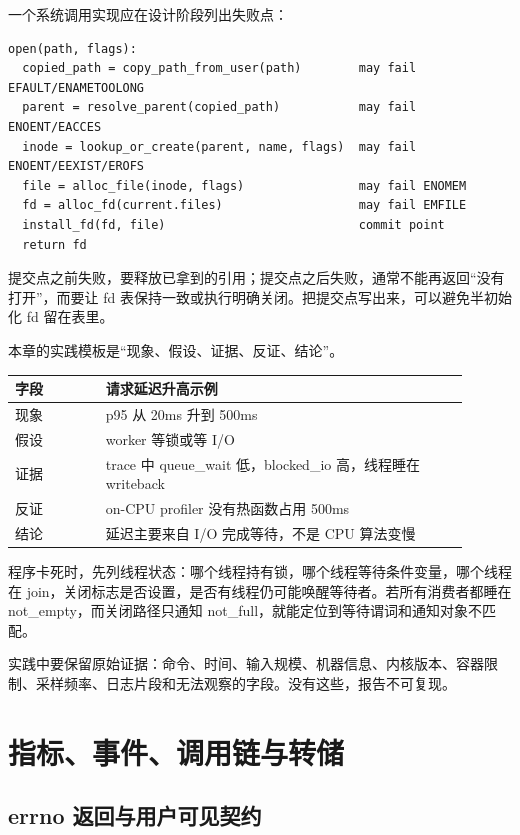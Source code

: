 一个系统调用实现应在设计阶段列出失败点：

\begin{lstlisting}
open(path, flags):
  copied_path = copy_path_from_user(path)        may fail EFAULT/ENAMETOOLONG
  parent = resolve_parent(copied_path)           may fail ENOENT/EACCES
  inode = lookup_or_create(parent, name, flags)  may fail ENOENT/EEXIST/EROFS
  file = alloc_file(inode, flags)                may fail ENOMEM
  fd = alloc_fd(current.files)                   may fail EMFILE
  install_fd(fd, file)                           commit point
  return fd
\end{lstlisting}

提交点之前失败，要释放已拿到的引用；提交点之后失败，通常不能再返回“没有打开”，而要让 fd 表保持一致或执行明确关闭。把提交点写出来，可以避免半初始化 fd 留在表里。

本章的实践模板是“现象、假设、证据、反证、结论”。

\begin{longtable}{|L{0.18\linewidth}|L{0.72\linewidth}|}
\toprule
字段 & 请求延迟升高示例 \\
\midrule
现象 & p95 从 20ms 升到 500ms \\\tablerowrule
假设 & worker 等锁或等 I/O \\\tablerowrule
证据 & trace 中 queue\_wait 低，blocked\_io 高，线程睡在 writeback \\\tablerowrule
反证 & on-CPU profiler 没有热函数占用 500ms \\\tablerowrule
结论 & 延迟主要来自 I/O 完成等待，不是 CPU 算法变慢 \\
\bottomrule
\end{longtable}

程序卡死时，先列线程状态：哪个线程持有锁，哪个线程等待条件变量，哪个线程在 join，关闭标志是否设置，是否有线程仍可能唤醒等待者。若所有消费者都睡在 not\_empty，而关闭路径只通知 not\_full，就能定位到等待谓词和通知对象不匹配。

实践中要保留原始证据：命令、时间、输入规模、机器信息、内核版本、容器限制、采样频率、日志片段和无法观察的字段。没有这些，报告不可复现。

\section{指标、事件、调用链与转储}

\subsection{errno 返回与用户可见契约}

